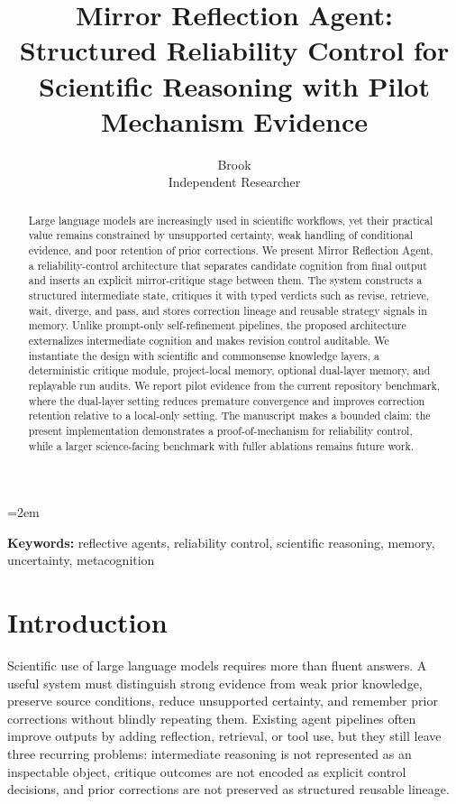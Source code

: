 \documentclass[12pt]{article}
\title{\textbf{Mirror Reflection Agent: Structured Reliability Control for Scientific Reasoning with Pilot Mechanism Evidence}}
\author{Brook \\ Independent Researcher}
\date{}
\begin{document}
\maketitle
\onehalfspacing
\emergencystretch=2em

\begin{abstract}
Large language models are increasingly used in scientific workflows, yet their practical value remains constrained by unsupported certainty, weak handling of conditional evidence, and poor retention of prior corrections. We present Mirror Reflection Agent, a reliability-control architecture that separates candidate cognition from final output and inserts an explicit mirror-critique stage between them. The system constructs a structured intermediate state, critiques it with typed verdicts such as revise, retrieve, wait, diverge, and pass, and stores correction lineage and reusable strategy signals in memory. Unlike prompt-only self-refinement pipelines, the proposed architecture externalizes intermediate cognition and makes revision control auditable. We instantiate the design with scientific and commonsense knowledge layers, a deterministic critique module, project-local memory, optional dual-layer memory, and replayable run audits. We report pilot evidence from the current repository benchmark, where the dual-layer setting reduces premature convergence and improves correction retention relative to a local-only setting. The manuscript makes a bounded claim: the present implementation demonstrates a proof-of-mechanism for reliability control, while a larger science-facing benchmark with fuller ablations remains future work.
\end{abstract}

\noindent\textbf{Keywords:} reflective agents, reliability control, scientific reasoning, memory, uncertainty, metacognition

\section{Introduction}

Scientific use of large language models requires more than fluent answers. A useful system must distinguish strong evidence from weak prior knowledge, preserve source conditions, reduce unsupported certainty, and remember prior corrections without blindly repeating them. Existing agent pipelines often improve outputs by adding reflection, retrieval, or tool use, but they still leave three recurring problems: intermediate reasoning is not represented as an inspectable object, critique outcomes are not encoded as explicit control decisions, and prior corrections are not preserved as structured reusable lineage.
\end{document}
